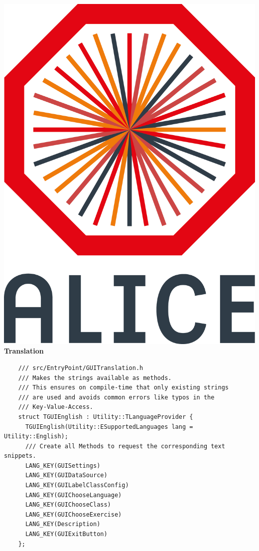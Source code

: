 \documentclass[aspectratio=1610,14pt,dvipsnames]{beamer}
\begin{document}
\begin{frame}[fragile]{\includegraphics[height=0.07\textheight]{2012-Jul-04-4_Color_Logo_CB.png} \hspace{0.2cm}\textbf{Translation}}
  \begin{verbatim}
    /// src/EntryPoint/GUITranslation.h
    /// Makes the strings available as methods.
    /// This ensures on compile-time that only existing strings
    /// are used and avoids common errors like typos in the
    /// Key-Value-Access.
    struct TGUIEnglish : Utility::TLanguageProvider {
      TGUIEnglish(Utility::ESupportedLanguages lang = Utility::English);
      /// Create all Methods to request the corresponding text snippets.
      LANG_KEY(GUISettings)
      LANG_KEY(GUIDataSource)
      LANG_KEY(GUILabelClassConfig)
      LANG_KEY(GUIChooseLanguage)
      LANG_KEY(GUIChooseClass)
      LANG_KEY(GUIChooseExercise)
      LANG_KEY(Description)
      LANG_KEY(GUIExitButton)
    };
  \end{verbatim}
\end{frame}
\end{document}
